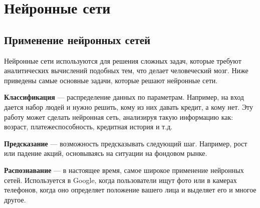\newpage

\chapter{Нейронные сети}
\section{Применение нейронных сетей}

\indent\indent Нейронные сети используются для решения сложных задач, которые требуют аналитических вычислений подобных тем, что делает человеческий мозг. Ниже приведены самые основные задачи, которые решают нейронные сети.

 \textbf{Классификация} — распределение данных по параметрам. Например, на вход дается набор людей и нужно решить, кому из них давать кредит, а кому нет. Эту работу может сделать нейронная сеть, анализируя такую информацию как: возраст, платежеспособность, кредитная история и т.д. 

 \textbf{Предсказание} — возможность предсказывать следующий шаг. Например, рост или падение акций, основываясь на ситуации на фондовом рынке. 

 \textbf{Распознавание} — в настоящее время, самое широкое применение нейронных сетей. Используется в Google, когда пользователи ищут фото или в камерах телефонов, когда оно определяет положение вашего лица и выделяет его и многое другое.

